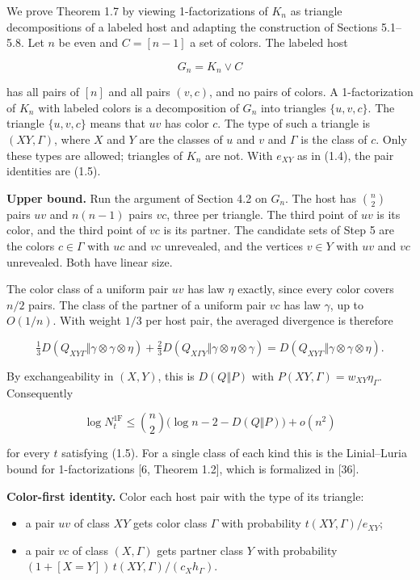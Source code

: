 \documentclass[english,11pt,a4paper]{article}
\providecommand{\tightlist}{\setlength{\itemsep}{0pt}\setlength{\parskip}{0pt}}
\begin{document}
We prove Theorem 1.7 by viewing 1-factorizations of \(K_n\) as triangle decompositions of a labeled host and adapting the construction of Sections 5.1--5.8. Let \(n\) be even and \(C=[n-1]\) a set of colors. The labeled host

\nopagebreak[4]
\[G_n=K_n\vee C\]

has all pairs of \([n]\) and all pairs \((v,c)\), and no pairs of colors. A 1-factorization of \(K_n\) with labeled colors is a decomposition of \(G_n\) into triangles \(\{u,v,c\}\). The triangle \(\{u,v,c\}\) means that \(uv\) has color \(c\). The type of such a triangle is \((XY,\Gamma)\), where \(X\) and \(Y\) are the classes of \(u\) and \(v\) and \(\Gamma\) is the class of \(c\). Only these types are allowed; triangles of \(K_n\) are not. With \(e_{XY}\) as in (1.4), the pair identities are (1.5).

\textbf{Upper bound.} Run the argument of Section 4.2 on \(G_n\). The host has \(\binom{n}{2}\) pairs \(uv\) and \(n(n-1)\) pairs \(vc\), three per triangle. The third point of \(uv\) is its color, and the third point of \(vc\) is its partner. The candidate sets of Step 5 are the colors \(c\in\Gamma\) with \(uc\) and \(vc\) unrevealed, and the vertices \(v\in Y\) with \(uv\) and \(vc\) unrevealed. Both have linear size.

The color class of a uniform pair \(uv\) has law \(\eta\) exactly, since every color covers \(n/2\) pairs. The class of the partner of a uniform pair \(vc\) has law \(\gamma\), up to \(O(1/n)\). With weight \(1/3\) per host pair, the averaged divergence is therefore

\nopagebreak[4]
\[\tfrac13D(Q_{XY\Gamma}\Vert\gamma\otimes\gamma\otimes\eta)+\tfrac23D(Q_{X\Gamma Y}\Vert\gamma\otimes\eta\otimes\gamma)=D(Q_{XY\Gamma}\Vert\gamma\otimes\gamma\otimes\eta).\]

By exchangeability in \((X,Y)\), this is \(D(Q\Vert P)\) with \(P(XY,\Gamma)=w_{XY}\eta_\Gamma\). Consequently

\nopagebreak[4]
\[\log N^{\mathrm{1F}}_t\le\binom{n}{2}\bigl(\log n-2-D(Q\Vert P)\bigr)+o(n^2)
\tag{5.3}\]

for every \(t\) satisfying (1.5). For a single class of each kind this is the Linial--Luria bound for 1-factorizations {[}6, Theorem 1.2{]}, which is formalized in {[}36{]}.

\textbf{Color-first identity.} Color each host pair with the type of its triangle:

\begin{itemize}
\tightlist
\item
  a pair \(uv\) of class \(XY\) gets color class \(\Gamma\) with probability \(t(XY,\Gamma)/e_{XY}\);
\item
  a pair \(vc\) of class \((X,\Gamma)\) gets partner class \(Y\) with probability \((1+[X=Y])\,t(XY,\Gamma)/(c_Xh_\Gamma)\).
\end{itemize}
\end{document}
